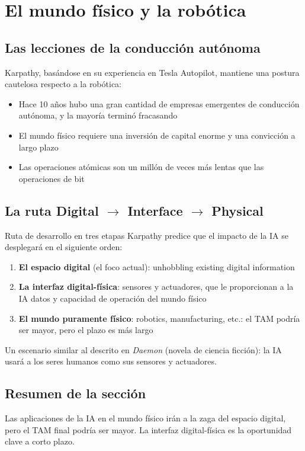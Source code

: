 \section{El mundo físico y la robótica}

\subsection{Las lecciones de la conducción autónoma}

Karpathy, basándose en su experiencia en Tesla Autopilot, mantiene una postura cautelosa respecto a la robótica:
\begin{itemize}
    \item Hace 10 años hubo una gran cantidad de empresas emergentes de conducción autónoma, y la mayoría terminó fracasando
    \item El mundo físico requiere una inversión de capital enorme y una convicción a largo plazo
    \item Las operaciones atómicas son un millón de veces más lentas que las operaciones de bit
\end{itemize}

\subsection{La ruta Digital $\rightarrow$ Interface $\rightarrow$ Physical}

\begin{knowledgebox}{Ruta de desarrollo en tres etapas}
Karpathy predice que el impacto de la IA se desplegará en el siguiente orden:
\begin{enumerate}
    \item \textbf{El espacio digital} (el foco actual): unhobbling existing digital information
    \item \textbf{La interfaz digital-física}: sensores y actuadores, que le proporcionan a la IA datos y capacidad de operación del mundo físico
    \item \textbf{El mundo puramente físico}: robotics, manufacturing, etc.: el TAM podría ser mayor, pero el plazo es más largo
\end{enumerate}
Un escenario similar al descrito en \textit{Daemon} (novela de ciencia ficción): la IA usará a los seres humanos como sus sensores y actuadores.
\end{knowledgebox}

\subsection{Resumen de la sección}

Las aplicaciones de la IA en el mundo físico irán a la zaga del espacio digital, pero el TAM final podría ser mayor. La interfaz digital-física es la oportunidad clave a corto plazo.
